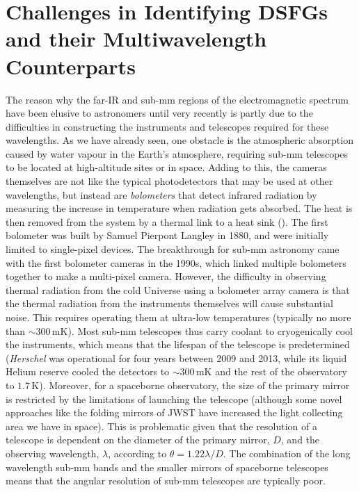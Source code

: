 \section{Challenges in Identifying DSFGs and their Multiwavelength Counterparts}
\label{sec:challenges}

The reason why the far-IR and sub-mm regions of the electromagnetic spectrum have been elusive to astronomers until very recently is partly due to the difficulties in constructing the instruments and telescopes required for these wavelengths. As we have already seen, one obstacle is the atmospheric absorption caused by water vapour in the Earth's atmosphere, requiring sub-mm telescopes to be located at high-altitude sites or in space. Adding to this, the cameras themselves are not like the typical photodetectors that may be used at other wavelengths, but instead are \textit{bolometers} that detect infrared radiation by measuring the increase in temperature when radiation gets absorbed. The heat is then removed from the system by a thermal link to a heat sink (\citealt{Woodcraft_2009}). The first bolometer was built by Samuel Pierpont Langley in 1880, and were initially limited to single-pixel devices. The breakthrough for sub-mm astronomy came with the first bolometer cameras in the 1990s, which linked multiple bolometers together to make a multi-pixel camera. However, the difficulty in observing thermal radiation from the cold Universe using a bolometer array camera is that the thermal radiation from the instruments themselves will cause substantial noise. This requires operating them at ultra-low temperatures (typically no more than $\sim 300\,$mK). Most sub-mm telescopes thus carry coolant to cryogenically cool the instruments, which means that the lifespan of the telescope is predetermined (\textit{Herschel} was operational for four years between 2009 and 2013, while its liquid Helium reserve cooled the detectors to $\sim 300\,$mK and the rest of the observatory to $1.7\,$K). Moreover, for a spaceborne observatory, the size of the primary mirror is restricted by the limitations of launching the telescope (although some novel approaches like the folding mirrors of JWST have increased the light collecting area we have in space). This is problematic given that the resolution of a telescope is dependent on the diameter of the primary mirror, $D$, and the observing wavelength, $\lambda$, according to $\theta = 1.22\lambda/D$. The combination of the long wavelength sub-mm bands and the smaller mirrors of spaceborne telescopes means that the angular resolution of sub-mm telescopes are typically poor. 

